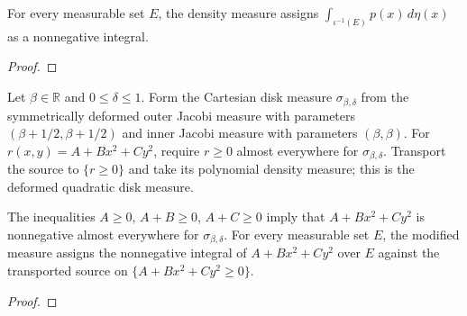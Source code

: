 \begin{supporting}
\begin{theorem}
\label{thm:multivariate-polynomial-density-measure}
\leanok
For every measurable set $E$, the density measure assigns
$\int_{\iota^{-1}(E)}p(x)\,d\eta(x)$ as a nonnegative integral.
\end{theorem}
\begin{proof}
\leanok
\end{proof}

\begin{definition}
\label{def:deformed-quadratic-disk-measure}
\leanok
Let $\beta\in\mathbb R$ and $0\le\delta\le1$. Form the Cartesian disk measure
$\sigma_{\beta,\delta}$ from the symmetrically deformed outer Jacobi measure
with parameters $(\beta+1/2,\beta+1/2)$ and inner Jacobi measure with parameters
$(\beta,\beta)$. For $r(x,y)=A+Bx^2+Cy^2$, require $r\ge0$ almost everywhere for $\sigma_{\beta,\delta}$.
Transport the source to $\{r\ge0\}$ and take its polynomial density measure;
this is the deformed quadratic disk measure.
\end{definition}

\begin{theorem}
\label{thm:deformed-quadratic-disk-measure}
\leanok
The inequalities $A\ge0$, $A+B\ge0$, $A+C\ge0$ imply that $A+Bx^2+Cy^2$ is nonnegative almost everywhere for $\sigma_{\beta,\delta}$. For every measurable set $E$, the modified measure assigns the
nonnegative integral of $A+Bx^2+Cy^2$ over $E$ against the transported source
on $\{A+Bx^2+Cy^2\ge0\}$.
\end{theorem}
\begin{proof}
\leanok
\end{proof}


\end{supporting}

